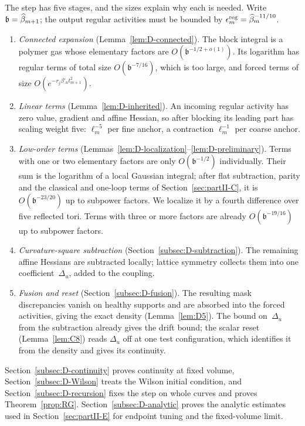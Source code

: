 The step has five stages, and the sizes explain why each is needed. Write $\mathfrak b=\widehat{\beta}_{m+1}$; the output regular activities must be bounded by $\epsilon_m^{\rm reg}=\widehat{\beta}_m^{-11/10}$.
\begin{enumerate}
\item \emph{Connected expansion} (Lemma~\ref{lem:D-connected}). The block integral is a polymer gas whose elementary factors are $O(\mathfrak b^{-1/2+o(1)})$. Its logarithm has regular terms of total size $O(\mathfrak b^{-7/16})$, which is too large, and forced terms of size $O(e^{-r_j\beta'_u t_{m+1}^2})$.
\item \emph{Linear terms} (Lemma~\ref{lem:D-inherited}). An incoming regular activity has zero value, gradient and affine Hessian, so after blocking its leading part has scaling weight five: $\ell_m^{-5}$ per fine anchor, a contraction $\ell_m^{-1}$ per coarse anchor.
\item \emph{Low-order terms} (Lemmas~\ref{lem:D-localization}--\ref{lem:D-preliminary}). Terms with one or two elementary factors are only $O(\mathfrak b^{-1/2})$ individually. Their sum is the logarithm of a local Gaussian integral; after flat subtraction, parity and the classical and one-loop terms of Section~\ref{sec:partII-C}, it is $O(\mathfrak b^{-23/20})$ up to subpower factors. We localize it by a fourth difference over five reflected tori. Terms with three or more factors are already $O(\mathfrak b^{-19/16})$ up to subpower factors.
\item \emph{Curvature-square subtraction} (Section~\ref{subsec:D-subtraction}). The remaining affine Hessians are subtracted locally; lattice symmetry collects them into one coefficient~$\Delta_u$, added to the coupling.
\item \emph{Fusion and reset} (Section~\ref{subsec:D-fusion}). The resulting mask discrepancies vanish on healthy supports and are absorbed into the forced activities, giving the exact density (Lemma~\ref{lem:D5}). The bound on~$\Delta_u$ from the subtraction already gives the drift bound; the scalar reset (Lemma~\ref{lem:C8}) reads $\Delta_u$ off at one test configuration, which identifies it from the density and gives its continuity.
\end{enumerate}
Section~\ref{subsec:D-continuity} proves continuity at fixed volume, Section~\ref{subsec:D-Wilson} treats the Wilson initial condition, and Section~\ref{subsec:D-recursion} fixes the step on whole curves and proves Theorem~\ref{prop:RG}. Section~\ref{subsec:D-analytic} proves the analytic estimates used in Section~\ref{sec:partII-E} for endpoint tuning and the fixed-volume limit.

